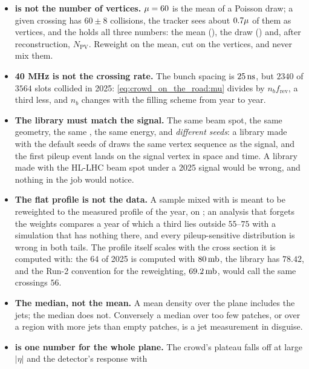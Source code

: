 \begin{pitfalls}
\begin{itemize}[nosep]
  \item \textbf{\mup is not the number of vertices.} $\mu=60$ is the
    mean of a Poisson draw; a given crossing has $60\pm8$ collisions, the
    tracker sees about $0.7\mu$ of them as vertices, and the
     holds all three numbers: the mean
    (), the draw
    () and, after reconstruction, $N_{\mathrm{PV}}$.
    Reweight on the mean, cut on the vertices, and never mix them.
  \item \textbf{40 MHz is not the crossing rate.} The bunch spacing is
    $25\,\mathrm{ns}$, but $2340$ of $3564$ slots collided in 2025: \cref{eq:crowd_on_the_road:mu}
    divides by $n_b f_{\mathrm{rev}}$, a third less, and $n_b$ changes
    with the filling scheme from year to year.
  \item \textbf{The library must match the signal.} The same beam spot,
    the same geometry, the same \GEANT, the same energy, and \emph{different
    seeds}: a library made with the default seeds of 
    draws the same vertex sequence as the signal, and the first pileup
    event lands on the signal vertex in space and time. A library made
    with the HL-LHC beam spot under a 2025 signal would be wrong, and
    nothing in the job would notice.
  \item \textbf{The flat profile is not the data.} A sample mixed with
     is meant to be reweighted to the measured
    profile of the year, on \mutrue; an analysis that forgets the weights
    compares a year of which a third lies outside $55$--$75$ with a
    simulation that has nothing there, and every pileup-sensitive
    distribution is wrong in both tails. The profile itself scales with
    the cross section it is computed with: the $64$ of 2025 is computed
    with $80\,\mathrm{mb}$, the library has $78.42$, and the Run-2 convention for
    the reweighting, $69.2\,\mathrm{mb}$, would call the same crossings $56$.
  \item \textbf{The median, not the mean.} A mean density over the plane
    includes the jets; the median does not. Conversely a median over too
    few patches, or over a region with more jets than empty patches, is a
    jet measurement in disguise.
  \item \textbf{\rhoPU is one number for the whole plane.} The crowd's
    plateau falls off at large $|\eta|$ and the detector's response with

\end{itemize}
\end{pitfalls}
